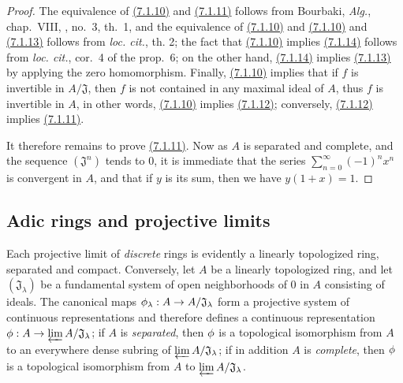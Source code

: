 \begin{proof}
\label{proof-0.7.1.10}
The equivalence of \hyperref[0.7.1.10]{(7.1.10)} and \hyperref[0.7.1.11]{(7.1.11)}
follows from Bourbaki, {\em Alg.}, chap.~VIII, , no.~3,
th.~1, and the equivalence of \hyperref[0.7.1.10]{(7.1.10)} and
\hyperref[0.7.1.10]{(7.1.10)} and \hyperref[0.7.1.13]{(7.1.13)} follows from
{\em loc. cit.}, th. 2; the fact that \hyperref[0.7.1.10]{(7.1.10)} implies
\hyperref[0.7.1.14]{(7.1.14)} follows from {\em loc. cit.},
cor.~4 of the prop.~6; on the other hand, \hyperref[0.7.1.14]{(7.1.14)} implies
\hyperref[0.7.1.13]{(7.1.13)} by applying the zero homomorphism. Finally,
\hyperref[0.7.1.10]{(7.1.10)} implies that if $f$ is invertible in $A/\mathfrak{J}$,
then $f$ is not contained in any maximal ideal of $A$, thus $f$ is invertible in $A$,
in other words, \hyperref[0.7.1.10]{(7.1.10)} implies \hyperref[0.7.1.12]{(7.1.12)};
conversely, \hyperref[0.7.1.12]{(7.1.12)} implies \hyperref[0.7.1.11]{(7.1.11)}.

It therefore remains to prove \hyperref[0.7.1.11]{(7.1.11)}. Now as $A$ is separated and
complete, and the sequence $(\mathfrak{J}^n)$ tends to $0$, it is immediate that
the series $\sum_{n=0}^\infty(-1)^n x^n$ is convergent in $A$, and that if $y$
is its sum, then we have $y(1+x)=1$.
\end{proof}

\subsection{Adic rings and projective limits}
\label{subsection-adic-rings-and-projective-limits}

\begin{env}[7.2.1]
\label{0.7.2.1}
Each projective limit of {\em discrete} rings is evidently a linearly
topologized ring, separated and compact. Conversely, let $A$ be a linearly
topologized ring, and let $(\mathfrak{J}_\lambda)$ be a fundamental system of
open neighborhoods of $0$ in $A$ consisting of
ideals. The canonical maps $\phi_\lambda:A\to A/\mathfrak{J}_\lambda$ form
a projective system of continuous representations and therefore defines a
continuous representation $\phi:A\to\varprojlim A/\mathfrak{J}_\lambda$; if $A$
is {\em separated}, then $\phi$ is a topological isomorphism from $A$ to an
everywhere dense subring of $\varprojlim A/\mathfrak{J}_\lambda$; if in
addition $A$ is {\em complete}, then $\phi$ is a topological isomorphism from
$A$ to $\varprojlim A/\mathfrak{J}_\lambda$.
\end{env}

